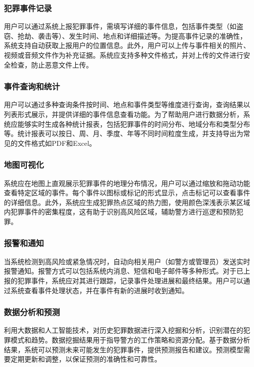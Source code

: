 \subsubsection{犯罪事件记录}

用户可以通过系统上报犯罪事件，需填写详细的事件信息，包括事件类型（如盗窃、抢劫、袭击等）、发生时间、地点和详细描述等。为提高事件记录的准确性，系统支持自动获取上报用户的位置信息。此外，用户可以上传与事件相关的照片、视频或音频文件作为补充证据。系统应支持多种文件格式，并对上传的文件进行安全检查，防止恶意文件上传。

\subsubsection{事件查询和统计}

用户可以通过多种查询条件按时间、地点和事件类型等维度进行查询，查询结果以列表形式展示，并提供详细的事件信息查看功能。为了帮助用户进行数据分析，系统应能够实时生成各种统计报表，包括犯罪事件的时间分布、地域分布和类型分布等。统计报表可以按日、周、月、季度、年等不同时间粒度生成，并支持导出为常见的文件格式如PDF和Excel。

\subsubsection{地图可视化}

系统应在地图上直观展示犯罪事件的地理分布情况，用户可以通过缩放和拖动功能查看特定区域的事件。每个事件以图标或标记的形式显示，点击标记可以查看事件的详细信息。此外，系统应生成犯罪热点区域的热力图，使用颜色深浅表示某区域内犯罪事件的密集程度，这有助于识别高风险区域，辅助警方进行巡逻和预防犯罪。

\subsubsection{报警和通知}

当系统检测到高风险或紧急情况时，自动向相关用户（如警方或管理员）发送实时报警通知。报警方式可以包括系统内消息、短信和电子邮件等多种形式。对于已上报的犯罪事件，系统应对其进行跟踪，记录事件处理进展和最终结果。用户可以通过系统查看事件处理状态，并在事件有新的进展时收到通知。

\subsubsection{数据分析和预测}

利用大数据和人工智能技术，对历史犯罪数据进行深入挖掘和分析，识别潜在的犯罪模式和趋势。数据挖掘结果用于指导警方的工作策略和资源分配。基于数据分析结果，系统可以预测未来可能发生的犯罪事件，提供预测报告和建议。预测模型需要定期更新和调整，以保证预测的准确性和可靠性。



